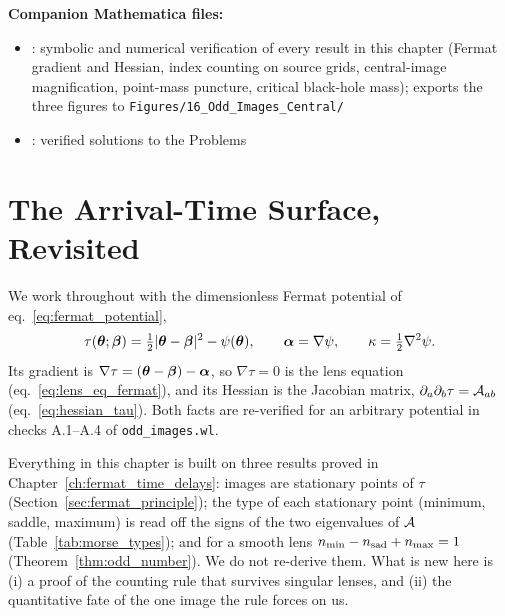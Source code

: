 \medskip
\noindent
\textbf{Companion Mathematica files:}
\begin{itemize}[nosep]
    \item {}:
          symbolic and numerical verification of every result in this
          chapter (Fermat gradient and Hessian, index counting on source
          grids, central-image magnification, point-mass puncture,
          critical black-hole mass); exports the three figures to
          \texttt{Figures/16\_Odd\_Images\_Central/}
    \item {}:
          verified solutions to the Problems
\end{itemize}


\section{The Arrival-Time Surface, Revisited}
\label{sec:oi_surface}

We work throughout with the dimensionless Fermat potential of
eq.~\eqref{eq:fermat_potential},
\begin{equation}
    \tau(\boldsymbol{\theta};\boldsymbol{\beta}) = \tfrac{1}{2}|\boldsymbol{\theta}-\boldsymbol{\beta}|^2 - \psi(\boldsymbol{\theta}),
    \qquad
    \boldsymbol{\alpha} = \nabla\psi, \qquad \kappa = \tfrac{1}{2}\nabla^2\psi .
    \label{eq:oi_tau}
\end{equation}
Its gradient is $\nabla\tau = (\boldsymbol{\theta}-\boldsymbol{\beta})-\boldsymbol{\alpha}$, so
$\nabla\tau=0$ is the lens equation (eq.~\ref{eq:lens_eq_fermat}), and
its Hessian is the Jacobian matrix, $\partial_a\partial_b\tau = \mathcal{A}_{ab}$
(eq.~\ref{eq:hessian_tau}).  Both facts are re-verified for an arbitrary
potential in checks A.1--A.4 of \texttt{odd\_images.wl}.

\begin{bridge}
Everything in this chapter is built on three results proved in
Chapter~\ref{ch:fermat_time_delays}: images are stationary points of
$\tau$ (Section~\ref{sec:fermat_principle}); the type of each stationary
point (minimum, saddle, maximum) is read off the signs of the two
eigenvalues of $\mathcal{A}$ (Table~\ref{tab:morse_types}); and for a smooth
lens $n_{\min}-n_{\rm sad}+n_{\max}=1$ (Theorem~\ref{thm:odd_number}).
We do not re-derive them.  What is new here is (i) a proof of the
counting rule that survives singular lenses, and (ii) the quantitative
fate of the one image the rule forces on us.
\end{bridge}


